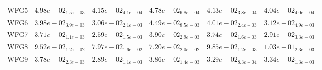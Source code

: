 \documentclass{article}
\begin{document}
\begin{table}
\begin{scriptsize}
\begin{tabular}{llllll}
WFG5 & $  4.98e-02_{ 1.5e-03}$ & $  4.15e-02_{ 4.1e-04}$ & $  4.78e-02_{ 6.8e-04}$ & \cellcolor{gray25}$  4.13e-02_{ 3.8e-04}$ & \cellcolor{gray95}$  4.04e-02_{ 4.0e-04}$ \\
WFG6 & $  3.98e-02_{ 3.9e-03}$ & \cellcolor{gray95}$  3.06e-02_{ 2.1e-03}$ & $  4.49e-02_{ 8.5e-03}$ & $  4.01e-02_{ 2.4e-03}$ & \cellcolor{gray25}$  3.12e-02_{ 4.9e-03}$ \\
WFG7 & $  3.71e-02_{ 1.1e-03}$ & \cellcolor{gray95}$  2.59e-02_{ 1.5e-03}$ & $  3.90e-02_{ 2.9e-03}$ & $  3.74e-02_{ 1.6e-03}$ & \cellcolor{gray25}$  2.91e-02_{ 3.3e-03}$ \\
WFG8 & $  9.52e-02_{ 1.2e-02}$ & \cellcolor{gray25}$  7.97e-02_{ 1.6e-02}$ & \cellcolor{gray95}$  7.20e-02_{ 2.0e-02}$ & $  9.85e-02_{ 1.2e-03}$ & $  1.03e-01_{ 2.3e-03}$ \\
WFG9 & $  3.78e-02_{ 2.3e-03}$ & \cellcolor{gray95}$  2.89e-02_{ 1.1e-03}$ & $  3.86e-02_{ 1.4e-03}$ & \cellcolor{gray25}$  3.29e-02_{ 8.3e-04}$ & $  3.34e-02_{ 1.3e-03}$ \\
\hline
\end{tabular}
\end{scriptsize}
\end{table}
\end{document}

